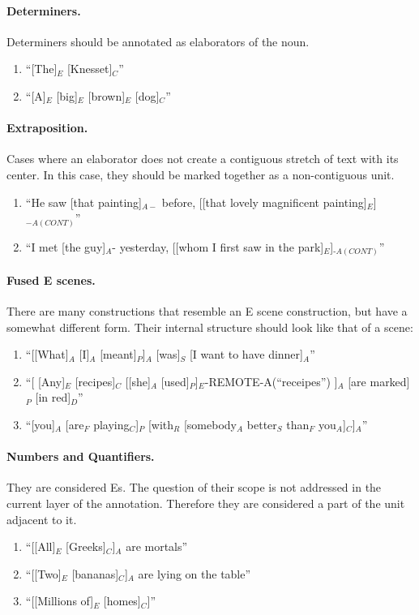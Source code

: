 \documentclass[11pt]{article}
\newcommand{\be}{\begin{enumerate}}
\newcommand{\ee}{\end{enumerate}}
\begin{document}
\paragraph{
Determiners.} Determiners should be annotated as elaborators of the noun.
\be \item
``[The]$_E$ [Knesset]$_C$''
\item
``[A]$_E$ [big]$_E$ [brown]$_E$ [dog]$_C$''
\ee

\paragraph{
Extraposition.} Cases where an elaborator does not create a contiguous stretch of text with its center. In this case, they should be marked together as a non-contiguous unit.
\be
\item
``He saw [that painting]$_{A-}$ before, [[that lovely magnificent painting]$_E$]$_{-A(CONT)}$''
\item
``I met [the guy]$_A$- yesterday, [[whom I first saw in the park]$_E$]$_{‑A(CONT)}$''
\ee

\paragraph{
Fused E scenes.} There are many constructions that resemble an E scene construction, but have a somewhat different form. Their internal structure should look like that of a scene:
\be \item
``[[What]$_A$ [I]$_A$ [meant]$_P$]$_A$ [was]$_S$ [I want to have dinner]$_A$''
\item
``[ [Any]$_E$ [recipes]$_C$ [[she]$_A$ [used]$_P$]$_E$-REMOTE-A(``receipes'') ]$_A$ [are marked]$_P$ [in red]$_D$''
\item
``[you]$_A$ [are$_F$ playing$_C$]$_P$ [with$_R$ [somebody$_A$ better$_S$ than$_F$ you$_A$]$_C$]$_A$''
\ee

\paragraph{
Numbers and Quantifiers.} They are considered Es. The question of their scope is not addressed in the current layer of the annotation. Therefore they are considered a part of the unit adjacent to it.
\be
\item
``[[All]$_E$ [Greeks]$_C$]$_A$ are mortals''
\item
``[[Two]$_E$ [bananas]$_C$]$_A$ are lying on the table''
\item
``[[Millions of]$_E$ [homes]$_C$]''
\ee
\end{document}
